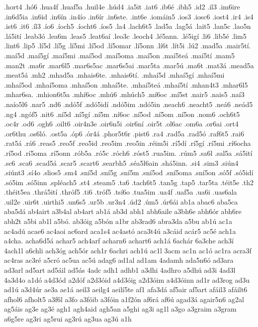 {.hort4
.hó6
.hua4f
.huaf5a
.huil4e
.húd4
.ia5it
.iat6
.ib6é
.ibh5
.id2
.il3
.im6ire
.in6d5ia
.in6id
.in6ín
.in4ío
.in6ír
.in6ste.
.int6e
.iomáin5
.ios3
.iosc6
.iost4
.ir4
.is4
.ist6
.it6
.íl3
.ío6
.íoch5
.íocht6
.íos5
.la4
.lach6t5
.lad5a
.lag5á
.lait5
.lan5c
.lao5n
.lá5ití
.leab3ó
.lea6m
.leas5
.leat6aí
.leo3c
.leoch4
.lé5ann.
.lé5igí
.li6
.lib5é
.lim5
.lint6
.lip5
.lí5d
.lí5g
.lí5mi
.lí5od
.lí5omar
.lí5onn
.lí6t
.lít5i
.lú2
.mad5a
.mair5tí.
.maí5d
.maí5gí
.maí5mi
.maí5od
.maí5oma
.maí5on
.maí5teá
.maí5tí
.mam5
.man2t
.ma6r
.mar6l5
.mar6s5ac
.mar6s5ai
.mar5ta
.mar5ú
.ma6t
.mat3á
.mead5a
.meat5á
.mh2
.mhad5a
.mhais6te.
.mhais6tí.
.mhaí5d
.mhaí5gí
.mhaí5mi
.mhaí5od
.mhaí5oma
.mhaí5on
.mhaí5te.
.mhaí5teá
.mhaí5tí
.mhan4t3
.mhar6l5
.mhar6sa.
.mhion6t5a
.mhí6oc
.mhú6
.mhúch5
.mí6oc
.mí5st
.nair5
.nais5
.naí3
.naío5l6
.nar5
.nd6
.ndó5f
.ndó5idí
.ndó5im
.ndó5in
.neach6
.neacht5
.neá6
.neád5
.ng4
.ngóf5
.nit6
.ní5d
.ní5gí
.ní5m
.ní6oc
.ní5od
.ní5om
.ní5on
.nom6
.och6t5
.oc4r
.od6
.ogh6
.oilt6
.oir4n3e
.oir6n5i
.oir6ní
.oir5t
.ol6ac
.om6a
.or6ai
.ort4
.or6thu
.os6ló.
.ost5a
.óp6
.ór4á
.phor5t6r
.pist6
.ra4
.rad5a
.rad5ó
.raf6t5
.rai6
.rat5á
.rá6
.reas5
.reo5f
.reo5id
.reo5im
.reo5in
.réim5i
.rí5dí
.rí5gí
.rí5mi
.rí6ocha
.rí5od
.rí5oma
.rí5onn
.rób5a
.ró5c
.róch6
.róst5
.rua5im.
.rúm5
.sa6l
.sal5a
.sá5ití
.sc6
.sca6
.scad5á
.scar5
.scart6
.searbh5
.séa5l6ain
.shá5inn.
.si4
.sim3
.siún4
.siúnt3
.sí4o
.slios5
.sm4
.sní5d
.sní5g
.sní5m
.sní5od
.sní5oma
.sní5on
.só5f
.só5idí
.só5im
.só5inn
.spléach5
.st4
.steam5
.ta6
.tach6t5
.tan5g
.tap5
.tar5ta
.téit5e
.th2
.théit5ea
.thrá5ití
.thróf5
.ti6
.tróf5
.tsí6o
.tua5im
.ua4f
.uaf5a
.ua6i
.uas6ala
.uil2e
.uir6t
.uirthi5
.un6s5
.ur5b
.ur3n4
.úd2
.úm5
.úr6ái
ab1a
abac6
aba5ca
aba5dá
ab4airt
a3b4al
ab4art
ab1á
ab3d
abh1
abh6aile
a3bh6e
abh6ór
abh6re
abh2t
a5bi
ab1l
a5bó.
ab3óig
a5bón
a1br
ab3rad6
abra3da
a5bu
ab1ú
ac1a
ac4adú
acae6
ac4aoi
ac6ard
aca1s4
ac4astó
aca3t4ú
a3cáid
acár5
ac5é
ach1a
a4cha.
acha6d5á
achar5
ach4arf
acharn6
achart6
ach1á
6achár
6a3che
ach3í
4ach1l
a6chli
ach3óg
ach5ór
ach1r
6achri
ach1ú
ac1l
3acm
ac1n
ac1ó
ac1ra
acra3f
ac4ras
ac3ré
a5cró
ac5ua
ac5ú
adag6
ad1al
ad1am
4adamh
ada5n6ó
ad3ara
ad3arl
ad5art
ad5áil
ad5ás
4adc
adh1
adhb1
a3dhi
4adhro
a5dhú
ad3i
4ad3l
4a3d4o
a1dó
a4d3ód
a2dóf
a2d3óid
a4d3óig
a2d3óim
a4d3óinn
ad1r
ad3rog
ad3u
ad1ú
a3d4úr
ae3a
ae1á
aeil3
aeilg4
aeilí5te
af1
afa3dá
af5air
af5art
afáil3
afáilt6
afhol6
afholt5
a3f6l
a3fo
a3fóib
a3fóin
a1f2ón
af6rá
af6ú
agad3á
agair5n6
ag2al
ag5áis
ag3e
ag3é
agh1
agh4aid
agh5an
a5ghi
ag3i
ag1l
a3go
a3graim
a3gram
a6g5re
ag3ri
ag5rui
ag3rú
ag3ua
ag3ú
a1h
}

